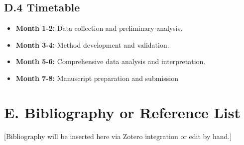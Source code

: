 \documentclass[12pt, a4paper]{article}
\begin{document}
\subsection*{D.4 Timetable}
\begin{itemize}
    \item \textbf{Month 1-2:} Data collection and preliminary analysis.
    \item \textbf{Month 3-4:} Method development and validation.
    \item \textbf{Month 5-6:} Comprehensive data analysis and interpretation.
    \item \textbf{Month 7-8:} Manuscript preparation and submission
\end{itemize}

\newpage
\section*{E. Bibliography or Reference List}

[Bibliography will be inserted here via Zotero integration or edit by hand.]
\end{document}
